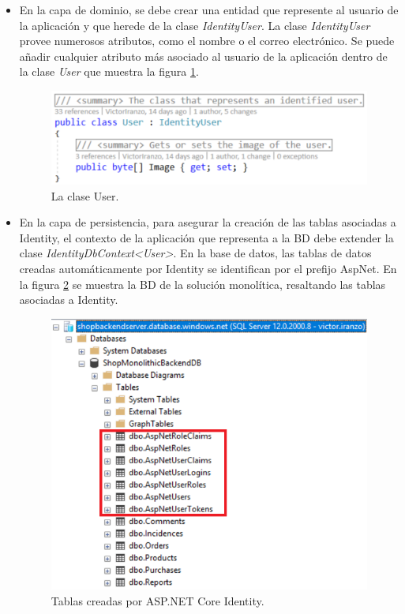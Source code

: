 \documentclass[11pt,spanish,listoffigures]{tfgetsinf}
\begin{document}
\begin{itemize}

\item En la capa de dominio, se debe crear una entidad que represente al usuario de la aplicación y que herede de la clase \textit{IdentityUser}. La clase \textit{IdentityUser} provee numerosos atributos, como el nombre o el correo electrónico. Se puede añadir cualquier atributo más asociado al usuario de la aplicación dentro de la clase \textit{User} que muestra la figura \ref{fig:User}.

\begin{figure}[h]
\centering
\includegraphics[scale=0.8]{User}
\caption{La clase User.}
\label{fig:User}
\end{figure}

\item En la capa de persistencia, para asegurar la creación de las tablas asociadas a Identity, el contexto de la aplicación que representa a la BD debe extender la clase \textit{IdentityDbContext<User>}. En la base de datos, las tablas de datos creadas automáticamente por Identity se identifican por el prefijo AspNet. En la figura \ref{fig:BDMonolitica} se muestra la BD de la solución monolítica, resaltando las tablas asociadas a Identity.

\begin{figure}[h]
\centering
\includegraphics[scale=0.8]{BDMonolitica}
\caption{Tablas creadas por ASP.NET Core Identity.}
\label{fig:BDMonolitica}
\end{figure}


\end{itemize}
\end{document}
